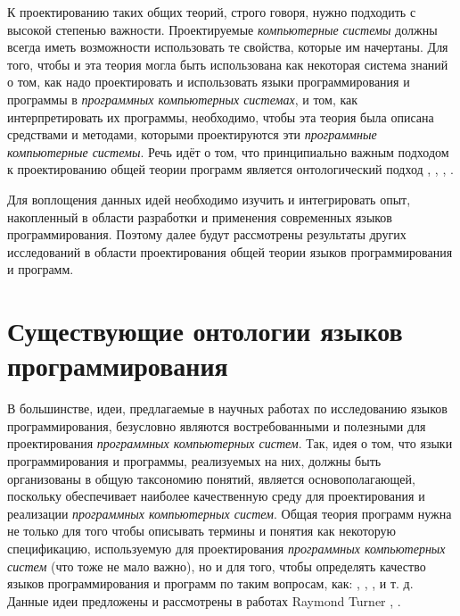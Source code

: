 К проектированию таких общих теорий, строго говоря, нужно подходить с высокой степенью важности. Проектируемые \textit{компьютерные системы} должны всегда иметь возможности использовать те свойства, которые им начертаны. Для того, чтобы и эта теория могла быть использована как некоторая система знаний о том, как надо проектировать и использовать языки программирования и программы в \textit{программных компьютерных системах}, и том, как интерпретировать их программы, необходимо, чтобы эта теория была описана средствами и методами, которыми проектируются эти \textit{программные компьютерные системы}. Речь идёт о том, что принципиально важным подходом к проектированию общей теории программ является онтологический подход , , \cite{Sales2022}, \cite{Samaa2020}.

Для воплощения данных идей необходимо изучить и интегрировать опыт, накопленный в области разработки и применения современных языков программирования. Поэтому далее будут рассмотрены результаты других исследований в области проектирования общей теории языков программирования и программ.

\section{Существующие онтологии языков программирования}
\label{sec_programs_ontologies}

В большинстве, идеи, предлагаемые в научных работах по исследованию языков программирования, безусловно являются востребованными и полезными для проектирования \textit{программных компьютерных систем}. Так, идея о том, что языки программирования и программы, реализуемых на них, должны быть организованы в общую таксономию понятий, является основополагающей, поскольку обеспечивает наиболее качественную среду для проектирования и реализации \textit{программных компьютерных систем}. Общая теория программ нужна не только для того чтобы описывать термины и понятия как некоторую спецификацию, используемую для проектирования \textit{программных компьютерных систем} (что тоже не мало важно), но и для того, чтобы определять качество языков программирования и программ по таким вопросам, как: , , ,  и т. д. Данные идеи предложены и рассмотрены в работах Raymond Turner \cite{Eden2007}, \cite{Turner2012}.

